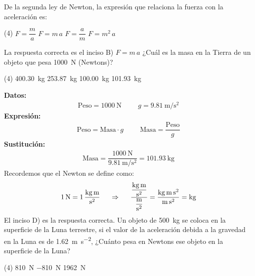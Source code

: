 \documentclass[12pt, letter]{exam}
\begin{document}
\begin{questions}
    \question De la segunda ley de Newton, la expresión que relaciona la fuerza con la aceleración es:
    \begin{tasks}(4)
        \task $F = \dfrac{m}{a}$
        \task $F = m \, a$
        \task $F = \dfrac{a}{m}$
        \task $F = m^{2} \, a$
    \end{tasks}
    La respuesta correcta es el inciso B) $F = m \, a$
    \question ¿Cuál es la masa en la Tierra de un objeto que pesa \SI{1000}{\newton} (Newtons)?
    \begin{tasks}(4)
        \task \SI{400.30}{\kilo\gram}
        \task \SI{253.87}{\kilo\gram}
        \task \SI{100.00}{\kilo\gram}
        \task \SI{101.93}{\kilo\gram}
    \end{tasks}
    \textbf{Datos:}
    \begin{align*}
    \text{Peso} = \SI{1000}{\newton} \hspace{1cm} g = \SI{9.81}{\meter\per\square\second}
    \end{align*}
    \textbf{Expresión:}
    \begin{align*}
    \text{Peso} = \text{Masa} \cdot g \hspace{1cm} \text{Masa} = \dfrac{\text{Peso}}{g}
    \end{align*}
    \textbf{Sustitución:}
    \begin{align*}
    \text{Masa} = \dfrac{\SI{1000}{\newton}}{\SI{9.81}{\meter\per\square\second}} = \SI{101.93}{\kilo\gram}
    \end{align*}
    Recordemos que el Newton se define como:
    \begin{align*}
    \SI{1}{\newton} = \SI[per-mode=fraction]{1}{\kilo\gram\meter\per\square\second} \hspace{0.5cm} \Rightarrow \hspace{0.5cm} \dfrac{\displaystyle \unit[per-mode=fraction]{\kilo\gram\meter\per\square\second}}{\displaystyle \unit[per-mode=fraction]{\meter\per\square\second}} = \dfrac{\unit{\kilo\gram\meter\square\second}}{\unit{\meter\square\second}} = \unit{\kilo\gram}
    \end{align*}
    El inciso D) es la respuesta correcta.
    \question Un objeto de \SI{500}{\kilo\gram} se coloca en la superficie de la Luna terrestre, si el valor de la aceleración debida a la gravedad en la Luna es de \SI{1.62}{\meter\per\square\second}, ¿Cuánto pesa en Newtons ese objeto en la superficie de la Luna?
    \begin{tasks}(4)
        \task \SI{810}{\newton}
        \task \SI{-810}{\newton}
        \task \SI{1962}{\newton}

\end{tasks}
\end{questions}
\end{document}
